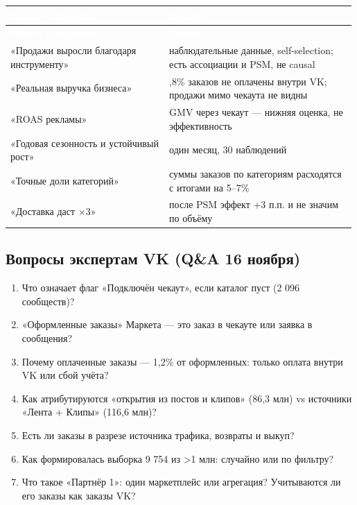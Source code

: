 \documentclass[10pt,a4paper]{article}
\begin{document}
\begingroup
\small
\setlength{\tabcolsep}{3pt}
\renewcommand{\arraystretch}{1.12}
\begin{longtable}{@{}>{\raggedright\arraybackslash}p{0.4532\linewidth}>{\raggedright\arraybackslash}p{0.5345\linewidth}@{}}
\rowcolor{blue}
\textcolor{white}{\textbf{Нельзя утверждать}} & \textcolor{white}{\textbf{Почему}} \\
\endfirsthead
\rowcolor{blue}
\textcolor{white}{\textbf{Нельзя утверждать}} & \textcolor{white}{\textbf{Почему}} \\
\endhead
\hline
«Продажи выросли благодаря инструменту» & наблюдательные данные, self-selection; есть ассоциации и PSM, не causal \\
«Реальная выручка бизнеса» & 98,8\% заказов не оплачены внутри VK; продажи мимо чекаута не видны \\
«ROAS рекламы» & GMV через чекаут — нижняя оценка, не эффективность \\
«Годовая сезонность и устойчивый рост» & один месяц, 30 наблюдений \\
«Точные доли категорий» & суммы заказов по категориям расходятся с итогами на 5–7\% \\
«Доставка даст ×3» & после PSM эффект +3 п.п. и не значим по объёму \\
\hline
\end{longtable}
\endgroup
\vspace{4pt}

\subsection{Вопросы экспертам VK (Q\&A 16 ноября)}

\begin{enumerate}[leftmargin=1.35em,itemsep=2pt,topsep=3pt,parsep=0pt]
\item Что означает флаг «Подключён чекаут», если каталог пуст (2 096 сообществ)?
\item «Оформленные заказы» Маркета — это заказ в чекауте или заявка в сообщения?
\item Почему оплаченные заказы — 1,2\% от оформленных: только оплата внутри VK или сбой учёта?
\item Как атрибутируются «открытия из постов и клипов» (86,3 млн) vs источники «Лента + Клипы» (116,6 млн)?
\item Есть ли заказы в разрезе источника трафика, возвраты и выкуп?
\item Как формировалась выборка 9 754 из >1 млн: случайно или по фильтру?
\item Что такое «Партнёр 1»: один маркетплейс или агрегация? Учитываются ли его заказы как заказы VK?
\end{enumerate}
\end{document}
